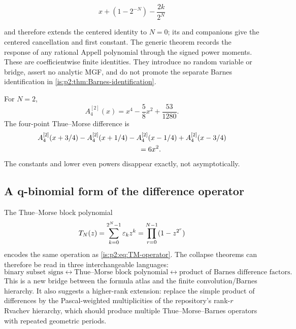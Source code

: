 \[
 x+(1-2^{-N})-\frac{2k}{2^N}
\]

and therefore extends the centered identity to $N=0$; its  and
 companions give the centered cancellation and first constant.
The generic theorem  records the
response of any rational Appell polynomial through the signed power moments.
These are coefficientwise finite identities.  They introduce no random
variable or  bridge, assert no analytic MGF, and do not promote
the separate Barnes identification in \cref{is:p2:thm:Barnes-identification}.

\begin{example}
For $N=2$,
\begin{equation}
 A_4^{[2]}(x)=x^4-\frac58x^2+\frac{53}{1280}.
 \label{is:p2:eq:A4N2}
\end{equation}
The four-point Thue--Morse difference is
\begin{align}
 &A_4^{[2]}(x+3/4)-A_4^{[2]}(x+1/4)
 -A_4^{[2]}(x-1/4)+A_4^{[2]}(x-3/4)
 \notag\\
 &\hspace{5cm}=6x^2.
 \label{is:p2:eq:A4N2-example}
\end{align}
The constants and lower even powers disappear exactly, not asymptotically.
\end{example}

\subsection{A q-binomial form of the difference operator}

The Thue--Morse block polynomial
\begin{equation}
 T_N(z)=\sum_{k=0}^{2^N-1}\varepsilon_kz^k
 =\prod_{r=0}^{N-1}(1-z^{2^r})
 \label{is:p2:eq:TN}
\end{equation}
encodes the same operation as \eqref{is:p2:eq:TM-operator}.  The collapse theorems can therefore be read
in three interchangeable languages:
\begin{equation}
 \text{binary subset signs}
 \longleftrightarrow
 \text{Thue--Morse block polynomial}
 \longleftrightarrow
 \text{product of Barnes difference factors}.
 \label{is:p2:eq:three-languages}
\end{equation}
This is a new bridge between the formula atlas and the finite convolution/Barnes hierarchy.  It also
suggests a higher-rank extension: replace the simple product of differences by the Pascal-weighted
multiplicities of the repository's rank-$r$ Rvachev hierarchy, which should produce multiple
Thue--Morse--Barnes operators with repeated geometric periods.


